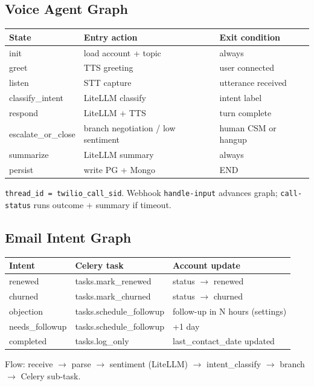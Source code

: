 \documentclass[11pt,a4paper]{article}
\begin{document}
\subsection{Voice Agent Graph}

\begin{tabularx}{\textwidth}{@{}L{3.4cm} p{4.2cm} Y@{}}
\toprule
\textbf{State} & \textbf{Entry action} & \textbf{Exit condition} \\
\midrule
init & load account + topic & always \\
greet & TTS greeting & user connected \\
listen & STT capture & utterance received \\
classify\_intent & LiteLLM classify & intent label \\
respond & LiteLLM + TTS & turn complete \\
escalate\_or\_close & branch negotiation / low sentiment & human CSM or hangup \\
summarize & LiteLLM summary & always \\
persist & write PG + Mongo & END \\
\bottomrule
\end{tabularx}

\texttt{thread\_id = twilio\_call\_sid}. Webhook \texttt{handle-input} advances graph; \texttt{call-status} runs outcome + summary if timeout.

\subsection{Email Intent Graph}

\begin{tabularx}{\textwidth}{@{}L{2.8cm} L{4.8cm} Y@{}}
\toprule
\textbf{Intent} & \textbf{Celery task} & \textbf{Account update} \\
\midrule
renewed & tasks.mark\_renewed & status $\rightarrow$ renewed \\
churned & tasks.mark\_churned & status $\rightarrow$ churned \\
objection & tasks.schedule\_followup & follow-up in N hours (settings) \\
needs\_followup & tasks.schedule\_followup & +1 day \\
completed & tasks.log\_only & last\_contact\_date updated \\
\bottomrule
\end{tabularx}

Flow: receive $\rightarrow$ parse $\rightarrow$ sentiment (LiteLLM) $\rightarrow$ intent\_classify $\rightarrow$ branch $\rightarrow$ Celery sub-task.
\end{document}
